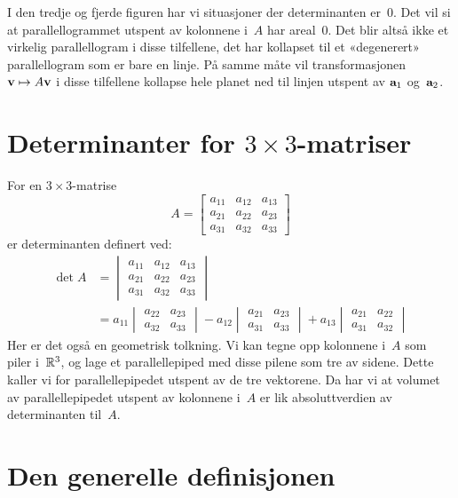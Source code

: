 I den tredje og fjerde figuren har vi situasjoner der determinanten
er~$0$.  Det vil si at parallellogrammet utspent av kolonnene i~$A$
har areal~$0$.  Det blir altså ikke et virkelig parallellogram i disse
tilfellene, det har kollapset til et «degenerert» parallellogram som
er bare en linje.  På samme måte vil transformasjonen
$\mathbf{v} \mapsto A \mathbf{v}$ i disse tilfellene kollapse hele planet ned
til linjen utspent av $\mathbf{a}_1$ og~$\mathbf{a}_2$.


\section*{Determinanter for $3 \times 3$-matriser}

For en $3 \times 3$-matrise
\[
A =
\begin{bmatrix}
a_{11} & a_{12} & a_{13} \\
a_{21} & a_{22} & a_{23} \\
a_{31} & a_{32} & a_{33}
\end{bmatrix}
\]
er determinanten definert ved:
\begin{align*}
\det A &=
\begin{vmatrix}
a_{11} & a_{12} & a_{13} \\
a_{21} & a_{22} & a_{23} \\
a_{31} & a_{32} & a_{33}
\end{vmatrix}
\\
&=
a_{11}
\begin{vmatrix}
a_{22} & a_{23} \\
a_{32} & a_{33}
\end{vmatrix}
- a_{12}
\begin{vmatrix}
a_{21} & a_{23} \\
a_{31} & a_{33}
\end{vmatrix}
+ a_{13}
\begin{vmatrix}
a_{21} & a_{22} \\
a_{31} & a_{32}
\end{vmatrix}
\end{align*}
Her er det også en geometrisk tolkning.  Vi kan tegne opp kolonnene
i~$A$ som piler i~$\mathbb{R}^3$, og lage et parallellepiped med disse pilene
som tre av sidene.  Dette kaller vi for parallellepipedet utspent av
de tre vektorene.  Da har vi at volumet av parallellepipedet utspent
av kolonnene i~$A$ er lik absoluttverdien av determinanten til~$A$.


\section*{Den generelle definisjonen}

